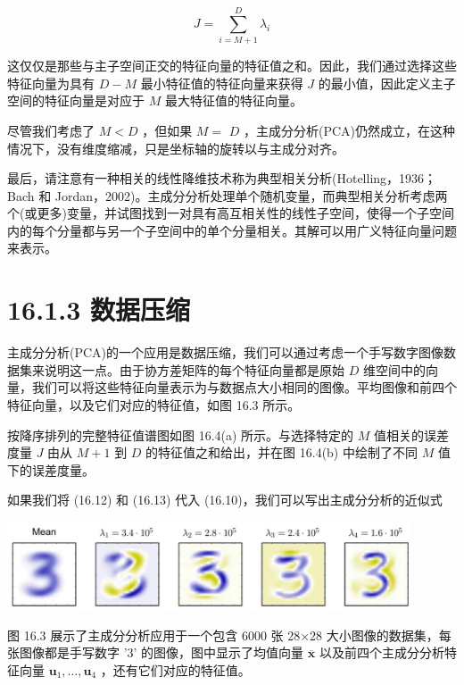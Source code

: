 \documentclass[10pt]{article}
\begin{document}
\[
J = \mathop{\sum }\limits_{{i = M + 1}}^{D}{\lambda }_{i} \tag{16.18}
\]

这仅仅是那些与主子空间正交的特征向量的特征值之和。因此，我们通过选择这些特征向量为具有 \(D - M\) 最小特征值的特征向量来获得 \(J\) 的最小值，因此定义主子空间的特征向量是对应于 \(M\) 最大特征值的特征向量。

尽管我们考虑了 \(M < D\) ，但如果 \(M =\)  \(D\) ，主成分分析(PCA)仍然成立，在这种情况下，没有维度缩减，只是坐标轴的旋转以与主成分对齐。

最后，请注意有一种相关的线性降维技术称为典型相关分析(Hotelling，1936；Bach 和 Jordan，2002)。主成分分析处理单个随机变量，而典型相关分析考虑两个(或更多)变量，并试图找到一对具有高互相关性的线性子空间，使得一个子空间内的每个分量都与另一个子空间中的单个分量相关。其解可以用广义特征向量问题来表示。

\section*{16.1.3 数据压缩}

主成分分析(PCA)的一个应用是数据压缩，我们可以通过考虑一个手写数字图像数据集来说明这一点。由于协方差矩阵的每个特征向量都是原始 \(D\) 维空间中的向量，我们可以将这些特征向量表示为与数据点大小相同的图像。平均图像和前四个特征向量，以及它们对应的特征值，如图 16.3 所示。

按降序排列的完整特征值谱图如图 16.4(a) 所示。与选择特定的 \(M\) 值相关的误差度量 \(J\) 由从 \(M + 1\) 到 \(D\) 的特征值之和给出，并在图 16.4(b) 中绘制了不同 \(M\) 值下的误差度量。

如果我们将 (16.12) 和 (16.13) 代入 (16.10)，我们可以写出主成分分析的近似式

\begin{center}
\includegraphics[max width=0.9\textwidth]{images/0194e279-9b28-703a-88f4-c3ac21e2010d_521_312_449_1229_270_0.jpg}
\end{center}
\hspace*{3em} 

图 16.3 展示了主成分分析应用于一个包含 6000 张 28×28 大小图像的数据集，每张图像都是手写数字 '3' 的图像，图中显示了均值向量 \(\overline{\mathbf{x}}\) 以及前四个主成分分析特征向量 \({\mathbf{u}}_{1},\ldots ,{\mathbf{u}}_{4}\) ，还有它们对应的特征值。
\end{document}
